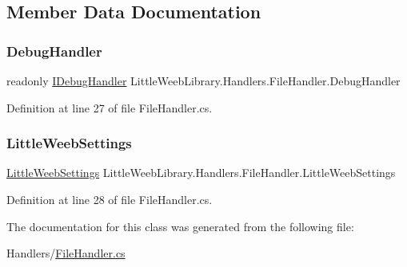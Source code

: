 \subsection{Member Data Documentation}
\mbox{\label{class_little_weeb_library_1_1_handlers_1_1_file_handler_a131760e1828cd7ae1df2e90e9f300426}} 
\subsubsection{\texorpdfstring{Debug\+Handler}{DebugHandler}}
{\footnotesize\ttfamily readonly \mbox{\hyperlink{interface_little_weeb_library_1_1_handlers_1_1_i_debug_handler}{I\+Debug\+Handler}} Little\+Weeb\+Library.\+Handlers.\+File\+Handler.\+Debug\+Handler\hspace{0.3cm}{\ttfamily [private]}}



Definition at line 27 of file File\+Handler.\+cs.

\mbox{\label{class_little_weeb_library_1_1_handlers_1_1_file_handler_aba666088c6ab88513663dfc7bbb45bf1}} 
\subsubsection{\texorpdfstring{Little\+Weeb\+Settings}{LittleWeebSettings}}
{\footnotesize\ttfamily \mbox{\hyperlink{class_little_weeb_library_1_1_settings_1_1_little_weeb_settings}{Little\+Weeb\+Settings}} Little\+Weeb\+Library.\+Handlers.\+File\+Handler.\+Little\+Weeb\+Settings\hspace{0.3cm}{\ttfamily [private]}}



Definition at line 28 of file File\+Handler.\+cs.



The documentation for this class was generated from the following file\+:\begin{DoxyCompactItemize}
\item 
Handlers/\mbox{\hyperlink{_file_handler_8cs}{File\+Handler.\+cs}}\end{DoxyCompactItemize}
